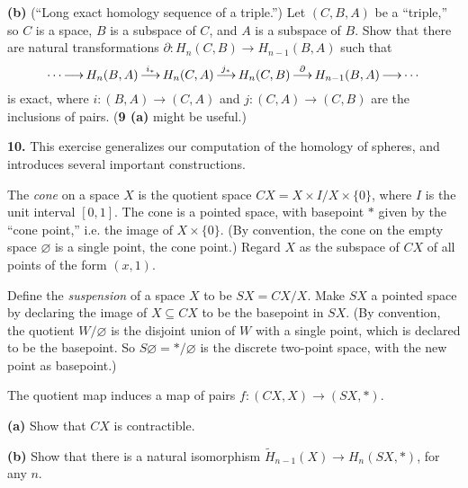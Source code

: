 \documentclass[12pt]{article}
\begin{document}
{\bf(b)} (``Long exact homology sequence of a triple.'')
Let $(C,B,A)$ be a ``triple,'' so $C$ is a space, $B$ is a
subspace of $C$, and $A$ is a subspace of $B$. Show that there  are
natural transformations $\partial:H_n(C,B)\rightarrow H_{n-1}(B,A)$ such 
that 
\[
\cdots\mathop{\longrightarrow}\limits^{}H_n(B,A)\mathop{\longrightarrow}\limits^{i_*}H_n(C,A)\mathop{\longrightarrow}\limits^{j_*}H_n(C,B)\mathop{\longrightarrow}\limits^{\partial}H_{n-1}(B,A)
\mathop{\longrightarrow}\limits^{}\cdots
\]
is exact, where $i:(B,A)\rightarrow(C,A)$ and $j:(C,A)\rightarrow(C,B)$ are
the inclusions of pairs. ({\bf 9 (a)} might be useful.)

\medskip
{\bf 10.} This exercise generalizes our computation of the homology of
spheres, and introduces several important constructions.

The {\em cone} on a space $X$ is the quotient space 
$CX=X\times I/X\times\{0\}$, where $I$ is the unit interval $[0,1]$. 
The cone is a pointed space, with basepoint $*$ given by the ``cone point,''
i.e. the image of $X\times\{0\}$. (By convention, the cone on the empty
space $\varnothing$
is a single point, the cone point.) Regard $X$ as the subspace of $CX$
of all points of the form $(x,1)$.

Define the {\em suspension} of a space $X$ to be $SX=CX/X$. 
Make $SX$ a pointed space by declaring
the image of $X\subseteq CX$ to be the basepoint in $SX$. 
(By convention, the quotient $W/\varnothing$ is the disjoint union of $W$ with
a single point, which is declared to be the basepoint. So 
$S\varnothing=*/\varnothing$ is the discrete two-point space, with the
new point as basepoint.)

The quotient map induces a map of pairs $f:(CX,X)\rightarrow(SX,*)$.

{\bf(a)} Show that $CX$ is contractible.

{\bf(b)} Show that there is a natural isomorphism 
$\widetilde{H}_{n-1}(X)\rightarrow H_n(SX,*)$, for any $n$.
\end{document}
